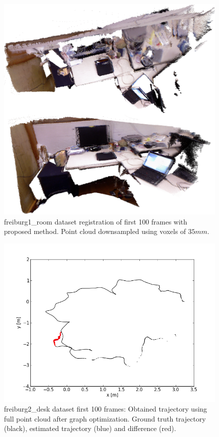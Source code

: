 \begin{figure}[H]
\begin{center}
\includegraphics[scale=0.27]{images/freiburg1_room.png}
\caption{freiburg1\_room dataset registration of first 100 frames with proposed method. Point cloud downsampled using voxels of $35mm$.}
\label{fig:jan}
\end{center}
\end{figure}


\begin{figure}[H]
\begin{center}
\includegraphics[scale=0.75]{images/freiburg2_desk_1_100_fullcloud_optimized.png}
\caption{freiburg2\_desk dataset first 100 frames: Obtained trajectory using full point cloud after graph optimization. Ground truth trajectory (black), estimated trajectory (blue) and difference (red).}
\label{fig:jan}
\end{center}
\end{figure}

